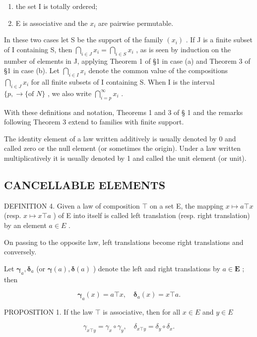 \begin{enumerate}
\def\labelenumi{(\alph{enumi})}
\item
  the set I is totally ordered;
\item
  E is associative and the \(x_{i}\) are pairwise permutable.
\end{enumerate}

In these two cases let S be the support of the family \((x_{i})\) . If J is a finite subset of I containing S, then \(\bigcap_{i\in J}x_{i} = \bigcap_{i\in S}x_{i}\) , as is seen by induction on the number of elements in J, applying Theorem 1 of §1 in case (a) and Theorem 3 of §1 in case (b). Let \(\bigcap_{i\in I}x_{i}\) denote the common value of the compositions \(\bigcap_{i\in J}x_{i}\) for all finite subsets of I containing S. When I is the interval \(\{p,\rightarrow\{\text{of }N\}\) , we also write \(\bigcap_{i=p}^{\infty}x_{i}\) .

With these definitions and notation, Theorems 1 and 3 of § 1 and the remarks following Theorem 3 extend to families with finite support.

The identity element of a law written additively is usually denoted by 0 and called zero or the null element (or sometimes the origin). Under a law written multiplicatively it is usually denoted by 1 and called the unit element (or unit).

\subsection{CANCELLABLE ELEMENTS}

DEFINITION 4. Given a law of composition \(\top\) on a set E, the mapping \(x \mapsto a \top x\) (resp. \(x \mapsto x \top a\) ) of E into itself is called left translation (resp. right translation) by an element \(a \in E\) .

On passing to the opposite law, left translations become right translations and conversely.

Let \(\pmb{\gamma}_{a},\pmb{\delta}_{a}\) (or \(\pmb {\gamma}(a),\pmb {\delta}(a)\) ) denote the left and right translations by \(a\in \mathbf{E}\) ; then

\[
\boldsymbol {\gamma} _ {a} (x) = a \top x, \quad \boldsymbol {\delta} _ {a} (x) = x \top a.
\]

PROPOSITION 1. If the law \(\top\) is associative, then for all \(x \in E\) and \(y \in E\)

\[
\gamma_ {x \top y} = \gamma_ {x} \circ \gamma_ {y}, \quad \delta_ {x \top y} = \delta_ {y} \circ \delta_ {x}.
\]

